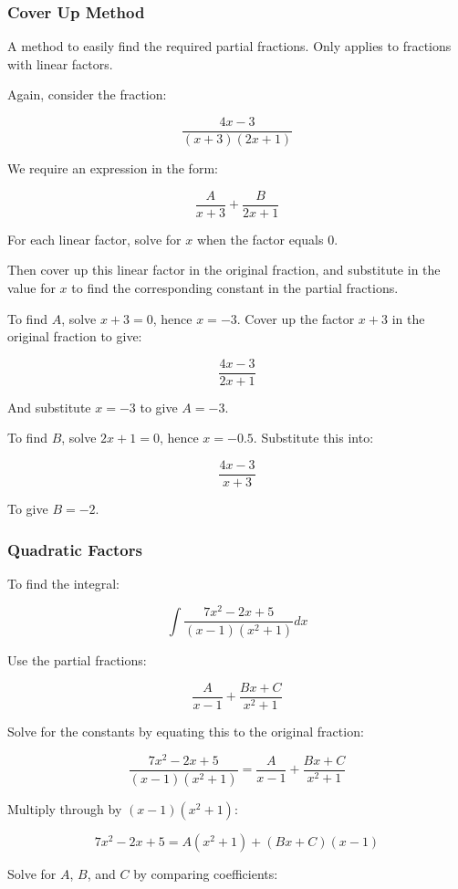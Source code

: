 \documentclass[a4paper,11pt]{article}
\begin{document}
\subsubsection{Cover Up Method}

A method to easily find the required partial fractions.
Only applies to fractions with linear factors.

Again, consider the fraction:

$$
\frac{4x - 3}{(x + 3)(2x + 1)}
$$

We require an expression in the form:

$$
\frac{A}{x + 3} + \frac{B}{2x + 1}
$$

For each linear factor, solve for $x$ when the factor equals 0.

Then cover up this linear factor in the original fraction, and substitute in
the value for $x$ to find the corresponding constant in the partial fractions.

To find $A$, solve $x + 3 = 0$, hence $x = -3$. Cover up the factor $x + 3$ in
the original fraction to give:

$$
\frac{4x - 3}{2x + 1}
$$

And substitute $x = -3$ to give $A = -3$.

To find $B$, solve $2x + 1 = 0$, hence $x = -0.5$. Substitute this into:

$$
\frac{4x - 3}{x + 3}
$$

To give $B = -2$.



\subsubsection{Quadratic Factors}

To find the integral:

$$
\int \frac{7x^2 - 2x + 5}{(x - 1)(x^2 + 1)} dx
$$

Use the partial fractions:

$$
\frac{A}{x - 1} + \frac{Bx + C}{x^2 + 1}
$$

Solve for the constants by equating this to the original fraction:

$$
\frac{7x^2 - 2x + 5}{(x - 1)(x^2 + 1)}  = \frac{A}{x - 1} + \frac{Bx + C}{x^2 + 1}
$$

Multiply through by $(x - 1)(x^2 + 1)$:

$$
7x^2 - 2x + 5  = A(x^2 + 1) + (Bx + C)(x - 1)
$$

Solve for $A$, $B$, and $C$ by comparing coefficients:
\end{document}
